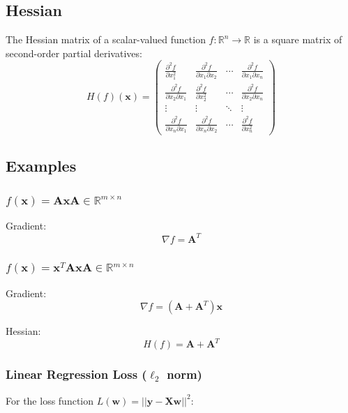 \documentclass[8pt, a4paper, landscape, includeheadfoot]{extarticle}
\begin{document}
\begin{multicols*}{4}
	\subsection{Hessian}
	The Hessian matrix of a scalar-valued function $f: \mathbb{R}^n \rightarrow \mathbb{R}$ is a square matrix of second-order partial derivatives:
	$$
		H(f)(\mathbf{x}) = \begin{pmatrix}
			\frac{\partial^2 f}{\partial x_1^2}            & \frac{\partial^2 f}{\partial x_1 \partial x_2} & \cdots & \frac{\partial^2 f}{\partial x_1 \partial x_n} \\
			\frac{\partial^2 f}{\partial x_2 \partial x_1} & \frac{\partial^2 f}{\partial x_2^2}            & \cdots & \frac{\partial^2 f}{\partial x_2 \partial x_n} \\
			\vdots                                         & \vdots                                         & \ddots & \vdots                                         \\
			\frac{\partial^2 f}{\partial x_n \partial x_1} & \frac{\partial^2 f}{\partial x_n \partial x_2} & \cdots & \frac{\partial^2 f}{\partial x_n^2}
		\end{pmatrix}
	$$

	\subsection{Examples}

	\subsubsection{\( f(\mathbf{x}) = \mathbf{A}\mathbf{x} \)\hfill $\mathbf{A}\in\mathbb{R}^{m\times n}$}{}

	Gradient:
	$$
		\nabla f = \mathbf{A}^T
	$$

	\subsubsection{\( f(\mathbf{x}) = \mathbf{x}^T\mathbf{A}\mathbf{x} \)\hfill $\mathbf{A}\in\mathbb{R}^{m\times n}$}{}

	Gradient:
	$$
		\nabla f = (\mathbf{A} + \mathbf{A}^T)\mathbf{x}
	$$

	Hessian:
	$$
		H(f) = \mathbf{A} + \mathbf{A}^T
	$$

	\subsubsection{Linear Regression Loss (\( \ell_2 \) \textbf{norm})}{}
	For the loss function \( L(\mathbf{w}) = ||\mathbf{y} - \mathbf{X}\mathbf{w}||^2 \):


\end{multicols*}
\end{document}
